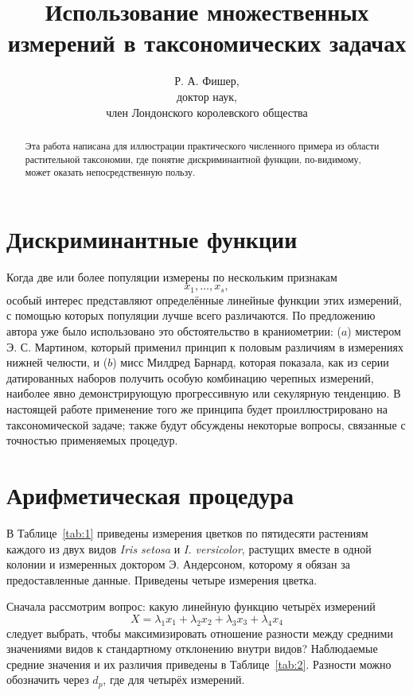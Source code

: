 \documentclass[12pt]{article}
\title{Использование множественных измерений в таксономических задачах}
\author{Р. А. Фишер,\\
  {\small доктор наук,}\\ 
  {\small член Лондонского королевского общества}}
\date{}
\begin{document}
\maketitle

\begin{abstract}
Эта работа написана для иллюстрации практического численного примера из области растительной таксономии, где понятие дискриминантной функции, по-видимому, может оказать непосредственную пользу.
\end{abstract}
\section{Дискриминантные функции}

Когда две или более популяции измерены по нескольким признакам 
\[
x_1, \dots, x_s,
\] особый интерес представляют определённые линейные функции этих измерений, с помощью которых популяции лучше всего различаются. По предложению автора уже было использовано это обстоятельство в краниометрии: ($a$) мистером Э. С. Мартином, который применил принцип к половым различиям в измерениях нижней челюсти, и ($b$) мисс Милдред Барнард, которая показала, как из серии датированных наборов получить особую комбинацию черепных измерений, наиболее явно демонстрирующую прогрессивную или секулярную тенденцию. В настоящей работе применение того же принципа будет проиллюстрировано на таксономической задаче; также будут обсуждены некоторые вопросы, связанные с точностью применяемых процедур.

\section{Арифметическая процедура}

В Таблице~\ref{tab:1} приведены измерения цветков по пятидесяти растениям каждого из двух видов \textit{Iris setosa} и \textit{I. versicolor}, растущих вместе в одной колонии и измеренных доктором Э. Андерсоном, которому я обязан за предоставленные данные. Приведены четыре измерения цветка.


Сначала рассмотрим вопрос: какую линейную функцию четырёх измерений
\[
X = \lambda_{1} x_{1} + \lambda_{2} x_{2} + \lambda_{3} x_{3} + \lambda_{4} x_{4}
\]
следует выбрать, чтобы максимизировать отношение разности между средними значениями видов к стандартному отклонению внутри видов? Наблюдаемые средние значения и их различия приведены в Таблице~\ref{tab:2}. Разности можно обозначить через $d_p$, где  для четырёх измерений.
\end{document}
